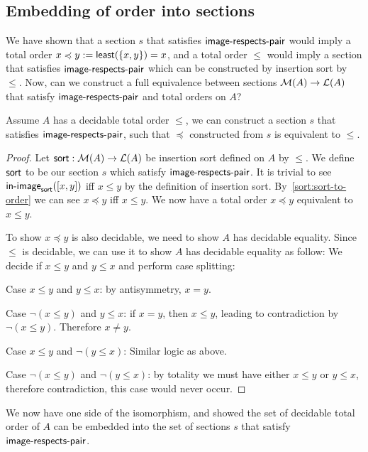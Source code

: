 \subsection{Embedding of order into sections}

We have shown that a section $s$ that satisfies $\operatorname{\mathsf{image-respects-pair}}$ would imply a total order
$x \preccurlyeq y := \operatorname{\mathsf{least}}(\{x, y\}) = x$,
and a total order $\leq$ would imply a section that satisfies $\operatorname{\mathsf{image-respects-pair}}$ which can
be constructed by insertion sort by $\leq$. Now, can we construct a full equivalence
between sections $\mathcal{M}(A) \to \mathcal{L}(A)$ that satisfy $\operatorname{\mathsf{image-respects-pair}}$ and total orders on $A$?

\begin{proposition}\label{sort:o2s2o}
    Assume $A$ has a decidable total order $\leq$, we can construct a section $s$ that
    satisfies $\operatorname{\mathsf{image-respects-pair}}$, such that $\preccurlyeq$ constructed from $s$ is equivalent
    to $\leq$.
\end{proposition}

\begin{proof}
    Let $\operatorname{\mathsf{sort}} : \mathcal{M}(A) \to \mathcal{L}(A)$ be insertion sort defined on $A$ by $\leq$.
    We define $\operatorname{\mathsf{sort}}$ to be our section $s$ which satisfy $\operatorname{\mathsf{image-respects-pair}}$.
    It is trivial to see $\operatorname{\mathsf{in-image}}_{\operatorname{\mathsf{sort}}}([x, y])$ iff $x \leq y$ by the definition
    of insertion sort. By~\cref{sort:sort-to-order} we can see $x \preccurlyeq y$ iff $x \leq y$.
    We now have a total order $x \preccurlyeq y$ equivalent to $x \leq y$.

    To show $x \preccurlyeq y$ is also decidable, we need to show $A$ has decidable equality.
    Since $\leq$ is decidable, we can use it to show $A$ has decidable equality as follow:
    We decide if $x \leq y$ and $y \leq x$ and perform case splitting:

    Case $x \leq y$ and $y \leq x$: by antisymmetry, $x = y$.
    
    Case $\neg(x \leq y)$ and $y \leq x$: if $x = y$, then $x \leq y$,
    leading to contradiction by $\neg(x \leq y)$. Therefore $x \neq y$.
    
    Case $x \leq y$ and $\neg(y \leq x)$: Similar logic as above.

    Case $\neg(x \leq y)$ and $\neg(y \leq x)$: by totality we must have either
    $x \leq y$ or $y \leq x$, therefore contradiction, this case would never occur.
\end{proof}

We now have one side of the isomorphism, and showed the set of decidable total order of $A$
can be embedded into the set of sections $s$ that satisfy $\operatorname{\mathsf{image-respects-pair}}$.

